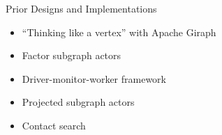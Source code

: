\documentclass[11pt]{beamer}
\begin{document}

\begin{frame}{Prior Designs and Implementations}
\begin{itemize}
  \item  ``Thinking like a vertex'' with Apache Giraph
  \item Factor subgraph actors
  \item Driver-monitor-worker framework
  \item Projected subgraph actors \citep{Tatton2022b}
  \item Contact search
\end{itemize}
\end{frame}
\end{document}
